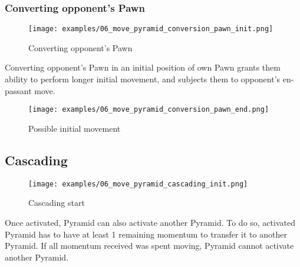 \clearpage %

\subsubsection*{Converting opponent's Pawn}

\noindent
\begin{wrapfigure}{l}{0.6\textwidth}
\centering
\texttt{[image: examples/06\_move\_pyramid\_conversion\_pawn\_init.png]}
\caption{Converting opponent's Pawn}
\label{fig:06_move_pyramid_conversion_pawn_init}
\end{wrapfigure}
Converting opponent's Pawn in an initial position of own Pawn grants them ability to perform longer initial
movement, and subjects them to opponent's en-passant move.

\vspace*{0.15\textheight} %
\noindent
\begin{wrapfigure}{r}{0.6\textwidth}
\centering
\texttt{[image: examples/06\_move\_pyramid\_conversion\_pawn\_end.png]}
\caption{Possible initial movement}
\label{fig:06_move_pyramid_conversion_pawn_end}
\end{wrapfigure}

\clearpage %

\subsection*{Cascading}

\noindent
\begin{figure}[!h]
\texttt{[image: examples/06\_move\_pyramid\_cascading\_init.png]}
\caption{Cascading start}
\label{fig:06_move_pyramid_cascading_init}
\end{figure}

Once activated, Pyramid can also activate another Pyramid. To do so, activated
Pyramid has to have at least 1 remaining momentum to transfer it to another
Pyramid. If all momentum received was spent moving, Pyramid cannot activate
another Pyramid.

\clearpage %

